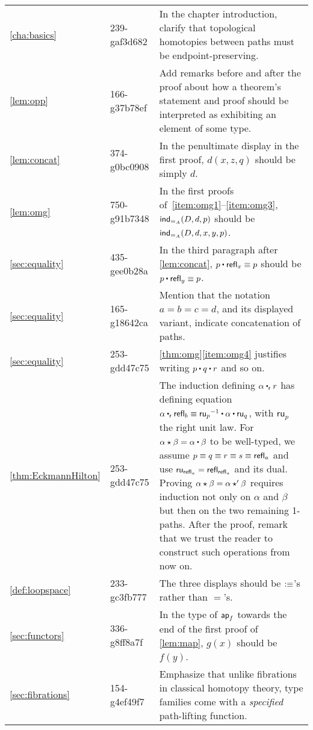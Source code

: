 \documentclass[
%
%
11pt %
]{article}
\newcounter{chapter}            %
\begin{document}
\begin{longtable}{llp{10.5cm}}
  \cref{cha:basics}
  & 239-gaf3d682
  & In the chapter introduction, clarify that topological homotopies between paths must be endpoint-preserving.\\
  \cref{lem:opp}
  & 166-g37b78ef
  & Add remarks before and after the proof about how a theorem's statement and proof should be interpreted as exhibiting an element of some type.\\
  \cref{lem:concat}
  & 374-g0bc0908
  & In the penultimate display in the first proof, $d(x,z,q)$ should be simply $d$.\\
  \cref{lem:omg}
  & 750-g91b7348
  & In the first proofs of~\ref{item:omg1}--\ref{item:omg3}, $\mathsf{ind}_{=_{A}}(D,d,p)$ should be $\mathsf{ind}_{=_{A}}(D,d,x,y,p)$.\\
  \cref{sec:equality}
  & 435-gee0b28a
  & In the third paragraph after \cref{lem:concat}, $p\ct\refl{x}\jdeq p$ should be $p\ct\refl{y}\jdeq p$.\\
  \cref{sec:equality}
  & 165-g18642ca
  & Mention that the notation $a=b=c=d$, and its displayed variant, indicate concatenation of paths.\\
  \cref{sec:equality}
  & 253-gdd47c75
  & \cref{thm:omg}\ref{item:omg4} justifies writing $p\ct q \ct r$ and so on.\\
  \cref{thm:EckmannHilton}
  & 253-gdd47c75
  & The induction defining $\alpha\rightwhisker r$ has defining equation $\alpha \rightwhisker \refl{b} \jdeq \opp{\mathsf{ru}_p} \ct \alpha \ct \mathsf{ru}_q$, with $\mathsf{ru}_p$ the right unit law.
  For $\alpha\hct\beta = \alpha\ct\beta$ to be well-typed, we assume $p\equiv q \equiv r \equiv s\equiv \mathsf{refl}_{a}$ and use $\mathsf{ru}_{\mathsf{refl}_{a}} = \mathsf{refl}_{\mathsf{refl}_{a}}$ and its dual.
  Proving $\alpha\star\beta = \alpha\star'\beta$ requires induction not only on $\alpha$ and $\beta$ but then on the two remaining 1-paths.
  After the proof, remark that we trust the reader to construct such operations from now on.\\
  \cref{def:loopspace}
  & 233-gc3fb777
  & The three displays should be $\vcentcolon\equiv$'s rather than $=$'s.\\
  \cref{sec:functors}
  & 336-g8ff8a7f
  & In the type of $\mathsf{ap}_{f}$ towards the end of the first proof of \cref{lem:map}, $g(x)$ should be $f(y)$.\\
  \cref{sec:fibrations}
  & 154-g4ef49f7
  & Emphasize that unlike fibrations in classical homotopy theory, type families come with a \emph{specified} path-lifting function.\\

\end{longtable}
\end{document}
